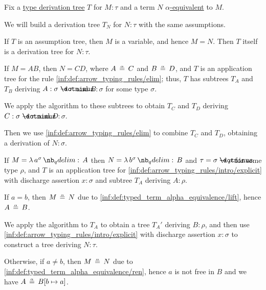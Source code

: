 \begin{algorithm}\label{alg:simply_typed_alpha_conversion}
  Fix a \hyperref[def:type_derivation_tree]{type derivation tree} \( T \) for \( M: \tau \) and a term \( N \) \hyperref[def:typed_term_alpha_equivalence]{\( \alpha \)-equivalent} to \( M \).

  We will build a derivation tree \( T_N \) for \( N: \tau \) with the same assumptions.

  \begin{thmenum}
     If \( T \) is an assumption tree, then \( M \) is a variable, and hence \( M = N \). Then \( T \) itself is a derivation tree for \( N: \tau \).

     If \( M = AB \), then \( N = CD \), where \( A \aequiv C \) and \( B \aequiv D \), and \( T \) is an application tree for the rule \ref{inf:def:arrow_typing_rules/elim}; thus, \( T \) has subtrees \( T_A \) and \( T_B \) deriving \( A: \sigma \synimplies \tau \) and \( B: \sigma \) for some type \( \sigma \).

    We apply the algorithm to these subtrees to obtain \( T_C \) and \( T_D \) deriving \( C: \sigma \synimplies \tau \) and \( D: \sigma \).

    Then we use \ref{inf:def:arrow_typing_rules/elim} to combine \( T_C \) and \( T_D \), obtaining a derivation of \( N: \sigma \).

     If \( M = \qabs {a^\sigma} A \) then \( N = \qabs {b^\sigma} B \) and \( \tau = \sigma \synimplies \rho \) for some type \( \rho \), and \( T \) is an application tree for \ref{inf:def:arrow_typing_rules/intro/explicit} with discharge assertion \( x: \sigma \) and subtree \( T_A \) deriving \( A: \rho \).

    \begin{thmenum}
       If \( a = b \), then \( M \aequiv N \) due to \ref{inf:def:typed_term_alpha_equivalence/lift}, hence \( A \aequiv B \).

      We apply the algorithm to \( T_A \) to obtain a tree \( T_A' \) deriving \( B: \rho \), and then use \ref{inf:def:arrow_typing_rules/intro/explicit} with discharge assertion \( x: \sigma \) to construct a tree deriving \( N: \tau \).

       Otherwise, if \( a \neq b \), then \( M \aequiv N \) due to \ref{inf:def:typed_term_alpha_equivalence/ren}, hence \( a \) is not free in \( B \) and we have \( A \aequiv B[b \mapsto a] \).


\end{thmenum}
\end{thmenum}
\end{algorithm}
